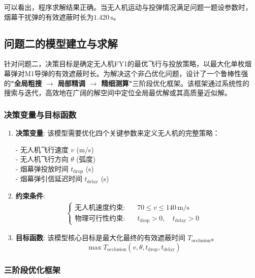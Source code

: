 \documentclass[12pt]{article}
\begin{document}
\begin{CJK}{UTF8}{gbsn}
		可以看出，程序求解结果正确。当无人机运动与投弹情况满足问题一题设参数时，烟幕干扰弹的有效遮蔽时长为$1.420\,\mathrm{s}$。
		
		
		\subsection{问题二的模型建立与求解}
		
		针对问题二，决策目标是确定无人机FY1的最优飞行与投放策略，以最大化单枚烟幕弹对M1导弹的有效遮蔽时长。为解决这个非凸优化问题，设计了一个鲁棒性强的\textbf{"全局粗搜 $\rightarrow$ 局部精调 $\rightarrow$ 精细测算"}三阶段优化框架。该框架通过系统性的搜索与迭代，高效地在广阔的解空间中定位全局最优解或其高质量近似解\cite{4}。
		
		\subsubsection{决策变量与目标函数}
		
		\begin{enumerate}
			\item \textbf{决策变量}: 该模型需要优化四个关键参数来定义无人机的完整策略：
			
			- 无人机飞行速度 $v$ (m/s)\\
			\indent	- 无人机飞行方向 $\theta$ (弧度)\\
			\indent	- 烟幕弹投放时间 $t_{\text{drop}}$ (s)\\
			\indent	- 烟幕弹引信延迟时间 $t_{\text{delay}}$ (s)
			
			\item \textbf{约束条件}:
			\begin{align}
				\left\{
				\begin{aligned}
					\text{无人机速度约束:} &\quad 70 \le v \le 140\,\text{m/s} \\
					\text{物理可行性约束:} &\quad t_{\text{drop}} > 0,\quad t_{\text{delay}} > 0
				\end{aligned}
				\right.
			\end{align}
			
			\item \textbf{目标函数}: 该模型核心目标是最大化最终的有效遮蔽时间 $T_{\text{occlusion}}$。
			\begin{equation}
				\max T_{\text{occlusion}}(v, \theta, t_{\text{drop}}, t_{\text{delay}})
			\end{equation}
		\end{enumerate}
		
		\subsubsection{三阶段优化框架}
		

\end{CJK}
\end{document}
